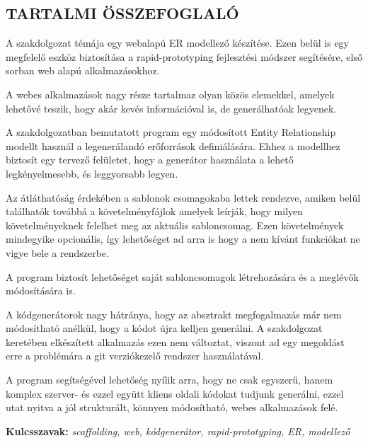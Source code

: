 \begin{center}
\section*{\textbf{\Large \MakeUppercase{\textrm{Tartalmi összefoglaló}}}}
\end{center}

\begin{justify}
A szakdolgozat témája egy webalapú ER modellező készítése. Ezen belül is egy megfelelő eszköz biztosítása a rapid-prototyping fejlesztési módszer segítésére, első sorban web alapú alkalmazásokhoz.

A webes alkalmazások nagy része tartalmaz olyan közös elemekkel, amelyek lehetővé teszik, hogy akár kevés információval is, de generálhatóak legyenek.

A szakdolgozatban bemutatott program egy módosított Entity Relationship modellt használ a legenerálandó erőforrások definiálására. Ehhez a modellhez biztosít egy tervező felületet, hogy a generátor használata a lehető legkényelmesebb, és leggyorsabb legyen.

Az átláthatóság érdekében a sablonok csomagokaba lettek rendezve, amiken belül találhatók továbbá a követelményfájlok amelyek leírják, hogy milyen követelményeknek felelhet meg az aktuális sabloncsomag. Ezen követelmények mindegyike opcionális, így lehetőséget ad arra is hogy a nem kívánt funkciókat ne vigye bele a rendszerbe.

A program  biztosít lehetőséget saját sabloncsomagok létrehozására és a meglévők módosítására is.

A kódgenerátorok nagy hátránya, hogy az absztrakt megfogalmazás már nem módosítható anélkül, hogy a kódot újra kelljen generálni. A szakdolgozat keretében elkészített alkalmazás ezen nem változtat, viszont ad egy megoldást erre a problémára a git verziókezelő rendszer használatával. 

A program segítségével lehetőség nyílik arra, hogy ne csak egyszerű, hanem komplex szerver- és ezzel együtt kliens oldali kódokat tudjunk generálni, ezzel utat nyitva a jól strukturált, könnyen módosítható, webes alkalmazások felé.
\end{justify}

\vspace{2cm}

{\bf Kulcsszavak:} {\it scaffolding, web, kódgenerátor, rapid-prototyping, ER, modellező}